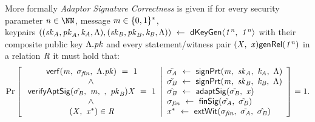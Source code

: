 \begin{definition}
    \label{def:sig:apt-sig-correctness}
    More formally \emph{Adaptor Signature Correctness} is given if for every security parameter $\varN \in \cnstNatural$, message $\mathit{m} \in \{0,1\}^{*}$, \\ keypairs
    $((\mathit{sk}_{\mathit{A}}, \mathit{pk}_{\mathit{A}}, \mathit{\mathit{k}_{\mathit{A}}}, \Lambda), (\mathit{sk}_{\mathit{B}}, \mathit{pk}_{\mathit{B}}, \mathit{\mathit{k}_{\mathit{B}}}, \Lambda)) ~\leftarrow~ \mathsf{dKeyGen}\langle \mathit{1^n} ,~ \mathit{1^n} \rangle$
    with their composite public key $\Lambda.\mathit{pk}$
    and every statement/witness pair $(\mathit{X} ,~ \mathit{x}) \mathsf{genRel}(\mathit{1^n})$ in a relation $\mathit{R}$ it must hold that:
    \[
        \Pr\left[
        \begin{array}{c}
            \:\mathsf{verf}(\mathit{m} ,~ \sigma_{\mathit{fin}} ,~ \Lambda.\mathit{pk}) ~=~ 1                                         \\
            ~\land~                                                                                              \\
            \: \mathsf{verifyAptSig}(\hat{\sigma_{\mathit{B}}} ,~ \mathit{m} ,~  ,~ \mathit{pk}_{\mathit{B}}){\mathit{X}} ~=~ 1             \\
            ~\land~                                                                                              \\
            \:(\mathit{X} ,~ \mathit{x}^*) \in \mathit{R}
        \end{array}
        \middle\vert
        \begin{array}{l}
            \tilde{\sigma_{\mathit{A}}} ~\leftarrow~ \mathsf{signPrt}(\mathit{m} ,~ \mathit{sk}_{\mathit{A}} ,~ \mathit{\mathit{k}_{\mathit{A}}} ,~ \Lambda)        \\
            \tilde{\sigma_{\mathit{B}}} ~\leftarrow~ \mathsf{signPrt}(\mathit{m} ,~ \mathit{sk}_{\mathit{B}} ,~ \mathit{\mathit{k}_{\mathit{B}}} ,~ \Lambda)              \\
            \hat{\sigma_{\mathit{B}}} ~\leftarrow~ \mathsf{adaptSig}(\tilde{\sigma_{\mathit{B}}} ,~ \mathit{x})                                             \\
            \sigma_{\mathit{fin}} ~\leftarrow~ \mathsf{finSig}(\tilde{\sigma_{\mathit{A}}} ,~ \tilde{\sigma_{\mathit{B}}})                                           \\
            \mathit{x}^* ~\leftarrow~ \mathsf{extWit}(\sigma_{\mathit{fin}} ,~ \tilde{\sigma_{\mathit{A}}} ,~ \hat{\sigma_{\mathit{B}}})
        \end{array}
        \right]=1.
    \]
\end{definition}

